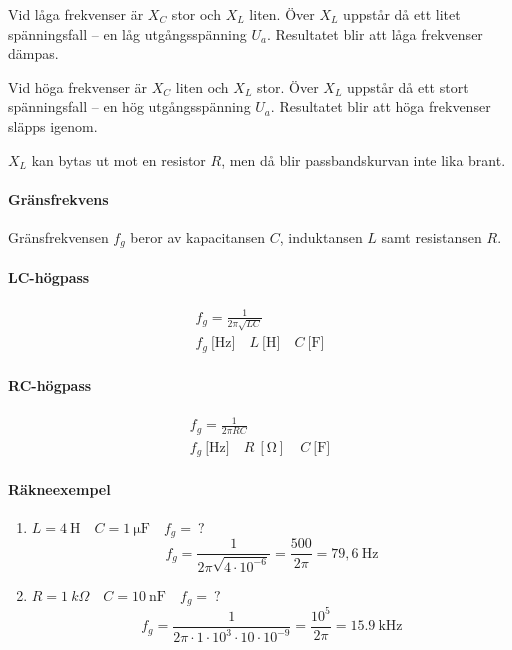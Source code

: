 Vid låga frekvenser är \(X_C\) stor och \(X_L\) liten.
Över \(X_L\) uppstår då ett litet spänningsfall -- en låg utgångsspänning \(U_a\).
Resultatet blir att låga frekvenser dämpas.

Vid höga frekvenser är \(X_C\) liten och \(X_L\) stor.
Över \(X_L\) uppstår då ett stort spänningsfall -- en hög utgångsspänning
\(U_a\).
Resultatet blir att höga frekvenser släpps igenom.

\(X_L\) kan bytas ut mot en resistor \(R\), men då blir passbandskurvan inte lika brant.

\paragraph{Gränsfrekvens}

Gränsfrekvensen \(f_g\) beror av kapacitansen \(C\), induktansen \(L\) samt
resistansen \(R\).

\paragraph{LC-högpass}
\begin{gather*}
  f_g = \frac{1}{2\pi \sqrt{LC}} \\
  f_g\ \text{[Hz]} \quad L\ \text{[H]} \quad C\ \text{[F]}
\end{gather*}

\paragraph{RC-högpass}
\begin{gather*}
  f_g = \frac{1}{2\pi RC}\\
  f_g\ \text{[Hz]} \quad R\ [\si{\ohm}] \quad C\ \text{[F]}
\end{gather*}

\paragraph{Räkneexempel}
\begin{enumerate}
\item \(L = 4\ \text{H} \quad C = 1\ \si{\micro\farad} \quad f_g =\ ?\)
  \[
  f_g = \frac{1}{2\pi \sqrt{4 \cdot 10^{-6}}} = \frac{500}{2\pi }
  = 79,6\ \text{Hz}
  \]
\item \(R = 1\ k\Omega \quad C = 10\ \text{nF} \quad f_g =\ ?\)
  \[
    f_g = \frac{1}{2\pi  \cdot 1 \cdot 10^3 \cdot 10 \cdot 10^{-9}}
    = \frac{10^5}{2\pi } = \SI{15,9}{\kilo\hertz}
  \]
\end{enumerate}

